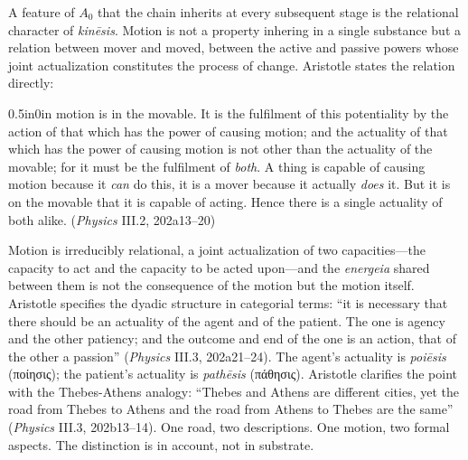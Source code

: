 \documentclass{article}
\newcommand{\gk}[1]{{\greekfont #1}}
\begin{document}
A feature of $A_0$ that the chain inherits at every subsequent stage is the relational character of \textit{kinēsis}. Motion is not a property inhering in a single substance but a relation between mover and moved, between the active and passive powers whose joint actualization constitutes the process of change. Aristotle states the relation directly:
\begin{adjustwidth}{0.5in}{0in}
motion is in the movable. It is the fulfilment of this potentiality by the action of that which has the power of causing motion; and the actuality of that which has the power of causing motion is not other than the actuality of the movable; for it must be the fulfilment of \textit{both}. A thing is capable of causing motion because it \textit{can} do this, it is a mover because it actually \textit{does} it. But it is on the movable that it is capable of acting. Hence there is a single actuality of both alike. (\textit{Physics} III.2, 202a13--20)
\end{adjustwidth}
Motion is irreducibly relational, a joint actualization of two capacities---the capacity to act and the capacity to be acted upon---and the \textit{energeia} shared between them is not the consequence of the motion but the motion itself. Aristotle specifies the dyadic structure in categorial terms: ``it is necessary that there should be an actuality of the agent and of the patient. The one is agency and the other patiency; and the outcome and end of the one is an action, that of the other a passion'' (\textit{Physics} III.3, 202a21--24). The agent's actuality is \textit{poiēsis} (\gk{ποίησις}); the patient's actuality is \textit{pathēsis} (\gk{πάθησις}). Aristotle clarifies the point with the Thebes-Athens analogy: ``Thebes and Athens are different cities, yet the road from Thebes to Athens and the road from Athens to Thebes are the same'' (\textit{Physics} III.3, 202b13--14). One road, two descriptions. One motion, two formal aspects. The distinction is in account, not in substrate.
\end{document}
